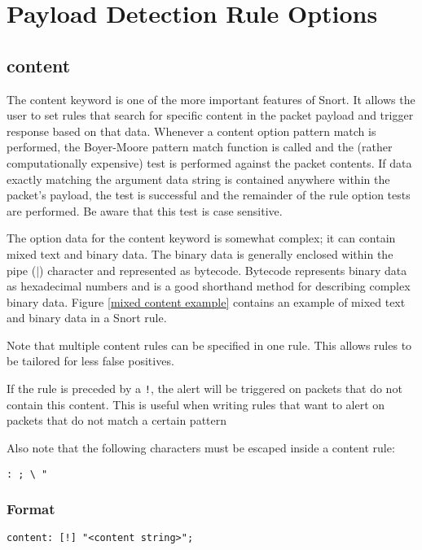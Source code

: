 \documentclass[english]{report}
\newenvironment{note}{
\samepage
    \vspace{10pt}{\textsf{
        {\hspace{7pt}\Huge{$\triangle$\hspace{-12.5pt}{\Large{$^!$}}}}\hspace{5pt}
        {\Large{NOTE}}
    }
    }
   \begin{center}
    \par\vspace{-17pt}

    \begin{lrbox}{\savepar}
    \begin{minipage}[r]{6in}
}
{
    \end{minipage}
    \end{lrbox}
    \fbox{
        \usebox{
            \savepar
	}
    }
    \par\vskip10pt
    \end{center}
}
\newenvironment{note}{
        \begin{rawhtml}
        <p><table border="1"><tr><td><b>
        Note:&nbsp;&nbsp;</b>
        \end{rawhtml}
}{
        \begin{rawhtml}
        </b></td></tr></table></p>
        \end{rawhtml}
}
\begin{document}
\section{Payload Detection Rule Options}
\subsection{content\label{sub:content}}

The content keyword is one of the more important features of Snort.
It allows the user to set rules that search for specific content in
the packet payload and trigger response based on that data. Whenever
a content option pattern match is performed, the Boyer-Moore pattern
match function is called and the (rather computationally expensive)
test is performed against the packet contents. If data exactly matching
the argument data string is contained anywhere within the packet's
payload, the test is successful and the remainder of the rule option
tests are performed. Be aware that this test is case sensitive.

The option data for the content keyword is somewhat complex; it can
contain mixed text and binary data. The binary data is generally enclosed
within the pipe ($|$) character and represented
as bytecode. Bytecode represents binary data as hexadecimal numbers
and is a good shorthand method for describing complex binary data.
Figure \ref{mixed content example} contains an example of mixed text
and binary data in a Snort rule. 

Note that multiple content rules can be specified in one rule. This
allows rules to be tailored for less false positives. 

If the rule is preceded by a \texttt{!}, the alert will be triggered
on packets that do not contain this content. This is useful when writing
rules that want to alert on packets that do not match a certain pattern

\begin{note}
Also note that the following characters must be escaped inside a content
rule:

\begin{verbatim}
: ; \ "
\end{verbatim}
\end{note}


\subsubsection{Format}

\begin{verbatim}
content: [!] "<content string>";
\end{verbatim}
\end{document}
